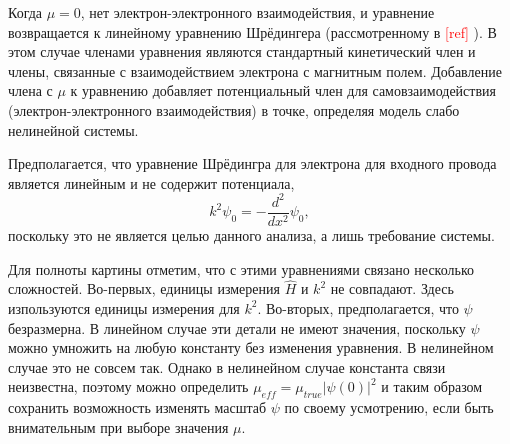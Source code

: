 \documentclass[A4,12pt,oneside]{article}
\renewcommand{\(}{\left(}
\renewcommand{\)}{\right)}
\newcommand{\citeph}{\textcolor{red}{[ref] }}
\begin{document}
Когда $\mu = 0$, нет электрон-электронного взаимодействия, 
и уравнение возвращается к линейному уравнению Шрёдингера (рассмотренному в \citeph). В этом случае членами уравнения являются стандартный кинетический член и члены, связанные с взаимодействием электрона с магнитным полем. Добавление члена с $\mu$ к уравнению добавляет потенциальный член для самовзаимодействия (электрон-электронного взаимодействия) в точке, определяя модель слабо нелинейной системы.

Предполагается, что уравнение Шрёдингра для электрона для входного провода является линейным и не содержит потенциала,
\begin{equation}
k^2 \psi_0 = -\frac{d^2}{dx^2}\psi_0,
\end{equation}
поскольку это не является целью данного анализа, а лишь требование системы.

Для полноты картины отметим, что с этими уравнениями связано несколько сложностей. Во-первых, единицы измерения $\hat{H}$ и $k^2$ не совпадают. Здесь изпользуются единицы измерения для $k^2$. Во-вторых, предполагается, что $\psi$ безразмерна. В линейном случае эти детали не имеют значения, поскольку $\psi$ можно умножить на любую константу без изменения уравнения. В нелинейном случае это не совсем так. Однако в нелинейном случае константа связи неизвестна, поэтому можно определить $\mu_{eff} = \mu_{true}\left|\psi\left(0\right)\right|^2$ и таким образом сохранить возможность изменять масштаб $\psi$ по своему усмотрению, если быть внимательным при выборе значения $\mu$.
\end{document}
